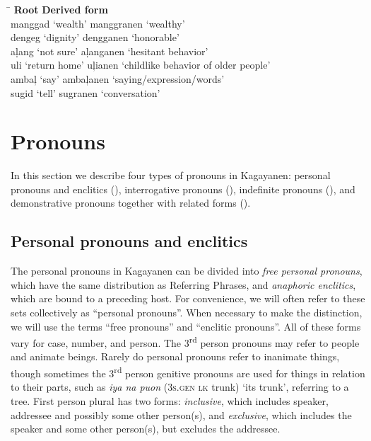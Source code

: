 \ea
\label{bkm:Ref118704475}
\begin{tabbing}
\hspace{3cm} \= \kill
\textbf{Root}  \>  \textbf{Derived form }\\
manggad ‘wealth’ \>  manggranen ‘wealthy’ \\
dengeg ‘dignity’ \>  dengganen ‘honorable’ \\
aļang  ‘not sure’ \>  aļanganen ‘hesitant behavior’ \\
uli ‘return home’ \>  uļianen ‘childlike behavior of older people’\footnotemark{} \\
ambaļ ‘say’ \>  ambaļanen ‘saying/expression/words’ \\
sugid ‘tell’ \>  sugranen ‘conversation’
\end{tabbing}
\z

\section{Pronouns}
\label{sec:pronouns}

In this section we describe four types of pronouns in Kagayanen: personal pronouns and enclitics (), interrogative pronouns (), indefinite pronouns (), and demonstrative pronouns together with related forms ().

\subsection{Personal pronouns and enclitics}
\label{sec:personalpronouns}
The personal pronouns in Kagayanen can be divided into \textit{free personal pronouns}, which have the same distribution as Referring Phrases, and \textit{anaphoric enclitics}, which are bound to a preceding host. For convenience, we will often refer to these sets collectively as “personal pronouns”. When necessary to make the distinction, we will use the terms “free pronouns” and “enclitic pronouns”. All of these forms vary for case, number, and person. The 3\textsuperscript{rd} person pronouns may refer to people and animate beings. Rarely do personal pronouns refer to inanimate things, though sometimes the 3\textsuperscript{rd} person genitive pronouns are used for things in relation to their parts, such as \textit{iya na puon} (3\textsc{s.gen lk} trunk) ‘its trunk’, referring to a tree. First person plural has two forms: \textit{inclusive}, which includes speaker, addressee and possibly some other person(s), and \textit{exclusive}, which includes the speaker and some other person(s), but excludes the addressee.

